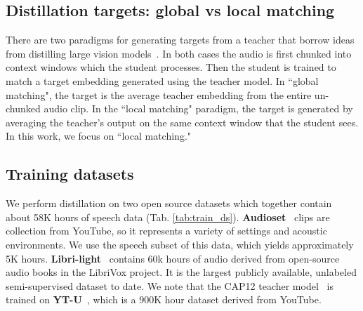 \subsection{Distillation targets: global vs local matching}
\label{subsec:matching}
There are two paradigms for generating targets from a teacher that borrow ideas from distilling large vision models~\cite{caron2021emerging}. In both cases the audio is first chunked into context windows which the student processes. Then the student is trained to match a target embedding generated using the teacher model. In ``global matching", the target is the average teacher embedding from the entire un-chunked audio clip. In the ``local matching" paradigm, the target is generated by averaging the teacher's output on the same context window that the student sees.  In this work, we focus on ``local matching."

\subsection{Training datasets}
We perform distillation on two open source datasets which together contain about 58K hours of speech data (Tab. \ref{tab:train_ds}). \textbf{Audioset}~\cite{audioset} clips are collection from YouTube, so it represents a variety of settings and acoustic environments. We use the speech subset of this data, which yields approximately 5K hours. \textbf{Libri-light}~\cite{librilight} contains 60k hours of audio derived from open-source audio books in the LibriVox project. It is the largest publicly available, unlabeled semi-supervised dataset to date. We note that the CAP12 teacher model~\cite{cap12} is trained on \textbf{YT-U}~\cite{bigssl}, which is a 900K hour dataset derived from YouTube.


